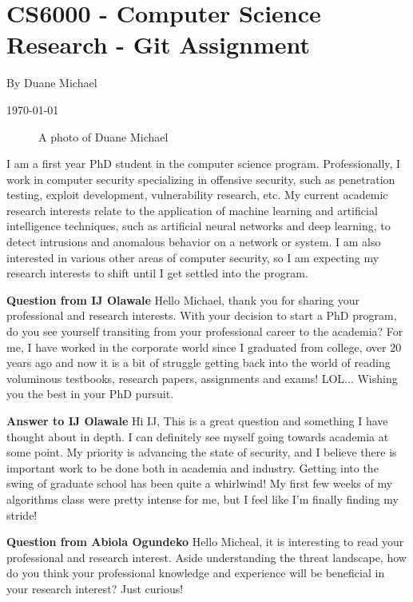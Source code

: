 
    
    \section{CS6000 - Computer Science Research - Git Assignment}
    By Duane Michael
    
    \today
 

\begin{figure}[h]
    \centering
    \caption{A photo of Duane Michael}
    \label{fig:headshot}
\end{figure}
I am a first year PhD student in the computer science program. Professionally, I work in computer security specializing in offensive security, such as penetration testing, exploit development, vulnerability research, etc. My current academic research interests relate to the application of machine learning and artificial intelligence techniques, such as artificial neural networks and deep learning, to detect intrusions and anomalous behavior on a network or system. I am also interested in various other areas of computer security, so I am expecting my research interests to shift until I get settled into the program.

\textbf{Question from IJ Olawale}
Hello Michael, thank you for sharing your professional and research interests. With your decision to start a PhD program, do you see yourself transiting from your professional career to the academia? For me, I have worked in the corporate world since I graduated from college, over 20 years ago and now it is a bit of struggle getting back into the world of reading voluminous testbooks, research papers, assignments and exams! LOL... Wishing you the best in your PhD pursuit.

\textbf{Answer to IJ Olawale}
Hi IJ, This is a great question and something I have thought about in depth. I can definitely see myself going towards academia at some point. My priority is advancing the state of security, and I believe there is important work to be done both in academia and industry. Getting into the swing of graduate school has been quite a whirlwind! My first few weeks of my algorithms class were pretty intense for me, but I feel like I'm finally finding my stride!

\textbf{Question from Abiola Ogundeko}
Hello Micheal, it is interesting to read your professional and research interest. Aside understanding the threat landscape, how do you think your professional knowledge and experience will be beneficial in your research interest? Just curious!

